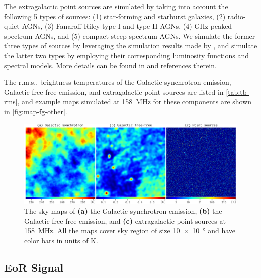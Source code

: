 \documentclass[twocolumn]{aastex62}
\makeatletter
\newcommand{\rms}{r.m.s\@ifnextchar.{}{.\@}}
\makeatother
\begin{document}
The extragalactic point sources are simulated by taking into account the
following 5 types of sources: (1) star-forming and starburst galaxies,
(2) radio-quiet AGNs, (3) Fanaroff-Riley type I and type II AGNs,
(4) GHz-peaked spectrum AGNs, and (5) compact steep spectrum AGNs.
We simulate the former three types of sources by leveraging the simulation
results made by \citet{wilman2008}, and simulate the latter two types
by employing their corresponding luminosity functions and spectral models.
More details can be found in \citet{wang2010} and references therein.

The \rms{} brightness temperatures of the Galactic synchrotron emission,
Galactic free-free emission, and extragalactic point sources are listed
in \autoref{tab:tb-rms}, and example maps simulated at \SI{158}{\MHz}
for these components are shown in \autoref{fig:map-fg-other}.

\begin{figure}
  \centering
  \includegraphics[width=\textwidth]{foregrounds-f158}
  \caption{\label{fig:map-fg-other}%
    The sky maps of
    \textbf{(a)} the Galactic synchrotron emission,
    \textbf{(b)} the Galactic free-free emission, and
    \textbf{(c)} extragalactic point sources
    at \SI{158}{\MHz}.
    All the maps cover sky region of size
    \SI[product-units=repeat]{10 x 10}{\degree}
    and have color bars in units of \si{\kelvin}.
  }
\end{figure}


\subsection{EoR Signal}
\label{sec:eor-signal}
\end{document}
